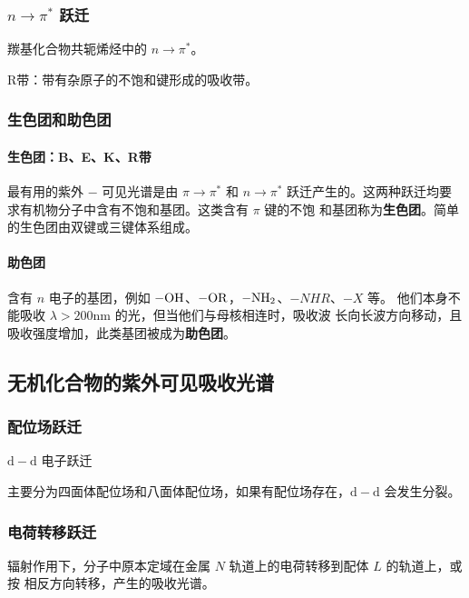 \subsubsection{$n \rightarrow \pi^*$ 跃迁}

羰基化合物共轭烯烃中的 $n \rightarrow \pi^*$。

R带：带有杂原子的不饱和键形成的吸收带。

\subsubsection{生色团和助色团}

\paragraph{生色团：B、E、K、R带}

最有用的紫外 $-$ 可见光谱是由 $\pi \rightarrow \pi^*$ 和 $n \rightarrow \pi^*$
跃迁产生的。这两种跃迁均要求有机物分子中含有不饱和基团。这类含有 $\pi$ 键的不饱
和基团称为\textbf{生色团}。简单的生色团由双键或三键体系组成。

\paragraph{助色团}

含有 $n$ 电子的基团，例如 $\ce{-OH}$、$\ce{-OR}$，$\ce{-NH2}$、$-NHR$、$-X$ 等。
他们本身不能吸收 $\lambda > 200 \mathrm{nm}$ 的光，但当他们与母核相连时，吸收波
长向长波方向移动，且吸收强度增加，此类基团被成为\textbf{助色团}。

\subsection{无机化合物的紫外可见吸收光谱}

\subsubsection{配位场跃迁}

$\mathrm{d} - \mathrm{d}$ 电子跃迁

主要分为四面体配位场和八面体配位场，如果有配位场存在，$\mathrm{d} - \mathrm{d}$
会发生分裂。

\subsubsection{电荷转移跃迁}

辐射作用下，分子中原本定域在金属 $N$ 轨道上的电荷转移到配体 $L$ 的轨道上，或按
相反方向转移，产生的吸收光谱。

